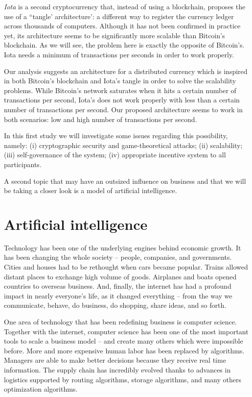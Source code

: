 \emph{Iota} is a second cryptocurrency that, instead of using a blockchain, proposes the use of a ``tangle' architecture': a different way to register the currency ledger across thousands of computers. Although it has not been confirmed in practice yet, its architecture seems to be significantly more scalable than Bitcoin's blockchain. As we will see, the problem here is exactly the opposite of Bitcoin's. Iota needs a minimum of transactions per seconds in order to work properly.

Our analysis suggests an architecture for a distributed currency which is inspired in both Bitcoin's blockchain and Iota's tangle in order to solve the scalability problems. While Bitcoin's network saturates when it hits a certain number of transactions per second, Iota's does not work properly with less than a certain number of transactions per second. Our proposed architecture seems to work in both scenarios: low and high number of transactions per second.

In this first study we will investigate some issues regarding this possibility, namely: (i) cryptographic security and game-theoretical attacks; (ii) scalability; (iii) self-governance of the system; (iv) appropriate incentive system to all participants.

A second topic that may have an outsized influence on business and that we will be taking a closer look is a model of artificial intelligence.

\section{Artificial intelligence}

Technology has been one of the underlying engines behind economic growth. It has been changing the whole society -- people, companies, and governments. Cities and houses had to be rethought when cars became popular. Trains allowed distant places to exchange high volume of goods. Airplanes and boats opened countries to overseas business. And, finally, the internet has had a profound impact in nearly everyone's life, as it changed everything -- from the way we communicate, behave, do business, do shopping, share ideas, and so forth.

One area of technology that has been redefining business is computer science. Together with the internet, computer science has been one of the most important tools to scale a business model -- and create many others which were impossible before. More and more expensive human labor has been replaced by algorithms. Managers are able to make better decisions because they receive real time information. The supply chain has incredibly evolved thanks to advances in logistics supported by routing algorithms, storage algorithms, and many others optimization algorithms.

